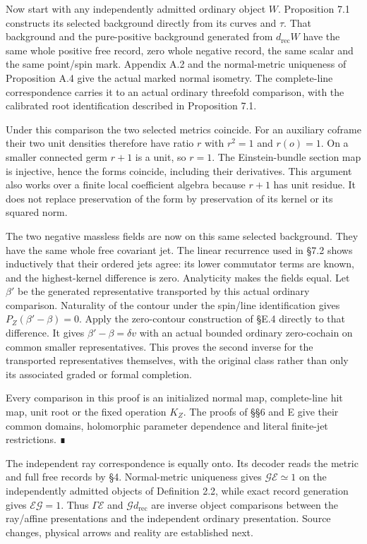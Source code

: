 \documentclass[
  english,
  11pt,
  reqno]{amsart}
\begin{document}
Now start with any independently admitted ordinary object \(W\).
Proposition 7.1 constructs its selected background directly from its
curves and \(\tau\). That background and the pure-positive background
generated from \(d_{\mathrm{rec}}W\) have the same whole positive free
record, zero whole negative record, the same scalar and the same
point/spin mark. Appendix A.2 and the normal-metric uniqueness of
Proposition A.4 give the actual marked normal isometry. The
complete-line correspondence carries it to an actual ordinary threefold
comparison, with the calibrated root identification described in
Proposition 7.1.

Under this comparison the two selected metrics coincide. For an
auxiliary coframe their two unit densities therefore have ratio \(r\)
with \(r^2=1\) and \(r(o)=1\). On a smaller connected germ \(r+1\) is a
unit, so \(r=1\). The Einstein-bundle section map is injective, hence
the forms coincide, including their derivatives. This argument also
works over a finite local coefficient algebra because \(r+1\) has unit
residue. It does not replace preservation of the form by preservation of
its kernel or its squared norm.

The two negative massless fields are now on this same selected
background. They have the same whole free covariant jet. The linear
recurrence used in §7.2 shows inductively that their ordered jets agree:
its lower commutator terms are known, and the highest-kernel difference
is zero. Analyticity makes the fields equal. Let \(\beta'\) be the
generated representative transported by this actual ordinary comparison.
Naturality of the contour under the spin/line identification gives
\(P_Z(\beta'-\beta)=0\). Apply the zero-contour construction of §E.4
directly to that difference. It gives \(\beta'-\beta=\delta v\) with an
actual bounded ordinary zero-cochain on common smaller representatives.
This proves the second inverse for the transported representatives
themselves, with the original class rather than only its associated
graded or formal completion.

Every comparison in this proof is an initialized normal map,
complete-line hit map, unit root or the fixed operation \(K_Z\). The
proofs of §§6 and E give their common domains, holomorphic parameter
dependence and literal finite-jet restrictions. ∎

The independent ray correspondence is equally onto. Its decoder reads
the metric and full free records by §4. Normal-metric uniqueness gives
\(\mathcal G\mathcal E\simeq1\) on the independently admitted objects of
Definition 2.2, while exact record generation gives
\(\mathcal E\mathcal G=1\). Thus \(\Gamma\mathcal E\) and
\(\mathcal Gd_{\mathrm{rec}}\) are inverse object comparisons between
the ray/affine presentations and the independent ordinary presentation.
Source changes, physical arrows and reality are established next.
\end{document}
